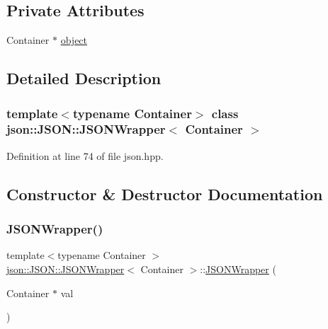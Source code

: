 \subsection*{Private Attributes}
\begin{DoxyCompactItemize}
\item 
Container $\ast$ \mbox{\hyperlink{classjson_1_1_j_s_o_n_1_1_j_s_o_n_wrapper_ab17f9cb0bc7be00173c3fdd75d2d0b73}{object}}
\end{DoxyCompactItemize}


\subsection{Detailed Description}
\subsubsection*{template$<$typename Container$>$\newline
class json\+::\+J\+S\+O\+N\+::\+J\+S\+O\+N\+Wrapper$<$ Container $>$}



Definition at line 74 of file json.\+hpp.



\subsection{Constructor \& Destructor Documentation}
\mbox{\label{classjson_1_1_j_s_o_n_1_1_j_s_o_n_wrapper_a9a19ac6ec042875536887ab2917c15f4}} 
\subsubsection{\texorpdfstring{J\+S\+O\+N\+Wrapper()}{JSONWrapper()}\hspace{0.1cm}{\footnotesize\ttfamily [1/2]}}
{\footnotesize\ttfamily template$<$typename Container $>$ \\
\mbox{\hyperlink{classjson_1_1_j_s_o_n_1_1_j_s_o_n_wrapper}{json\+::\+J\+S\+O\+N\+::\+J\+S\+O\+N\+Wrapper}}$<$ Container $>$\+::\mbox{\hyperlink{classjson_1_1_j_s_o_n_1_1_j_s_o_n_wrapper}{J\+S\+O\+N\+Wrapper}} (\begin{DoxyParamCaption}\item[{Container $\ast$}]{val }\end{DoxyParamCaption})\hspace{0.3cm}{\ttfamily [inline]}}



